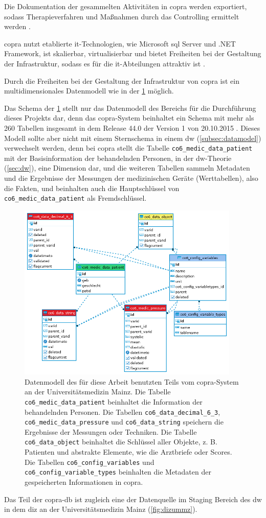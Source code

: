 Die Dokumentation der gesammelten Aktivitäten in \ac{copra} werden exportiert, sodass Therapieverfahren und Maßnahmen durch das Controlling ermittelt werden \cite{copra}.

\ac{copra} nutzt etablierte \ac{it}-Technologien, wie Microsoft \acs{sql} Server und .NET Framework, ist skalierbar, virtualisierbar und bietet Freiheiten bei der Gestaltung der Infrastruktur, sodass es für die \ac{it}-Abteilungen attraktiv ist \cite{copra}.

Durch die Freiheiten bei der Gestaltung der Infrastruktur von \ac{copra} ist ein multidimensionales Datenmodell wie in der \ref{fig:copraschema} möglich. 

Das Schema der \ref{fig:copraschema} stellt nur das Datenmodell des Bereichs für die Durchführung dieses Projekts dar, denn das \ac{copra}-System beinhaltet ein Schema mit mehr als 260 Tabellen insgesamt in dem Release 44.0 der Version 1 von 20.10.2015 \cite{copradoc}. Dieses Modell sollte aber nicht mit einem Sternschema in einem \ac{dw} (\ref{subsec:datamodel}) verwechselt werden, denn bei \ac{copra} stellt die Tabelle \texttt{co6\_medic\_data\_patient} mit der Basisinformation der behandelnden Personen, in der \ac{dw}-Theorie (\ref{sec:dw}), eine Dimension dar, und die weiteren Tabellen sammeln Metadaten und die Ergebnisse der Messungen der medizinischen Geräte (Werttabellen), also die Fakten, und beinhalten auch die Hauptschlüssel von \texttt{co6\_medic\_data\_patient} als Fremdschlüssel.

\clearpage

\begin{figure}[ht]
	\centering
	\includegraphics[height=8.5cm]{figures/copra_data_model_data}
	\caption[Datenmodell von \acs{copra}]{Datenmodell des für diese Arbeit benutzten Teils vom \ac{copra}-System an der Universitätsmedizin Mainz. Die Tabelle \texttt{co6\_medic\_data\_patient} beinhaltet die Information der behandelnden Personen. Die Tabellen \texttt{co6\_data\_decimal\_6\_3}, \texttt{co6\_medic\_data\_pressure} und \texttt{co6\_data\_string} speichern die Ergebnisse der Messungen oder Techniken. Die Tabelle \texttt{co6\_data\_object} beinhaltet die Schlüssel aller Objekte, z. B. Patienten und abstrakte Elemente, wie die Arztbriefe oder Scores.
	Die Tabellen \texttt{co6\_config\_variables} und \texttt{co6\_config\_variable\_types} beinhalten die Metadaten der gespeicherten Informationen in \ac{copra}.}
	\label{fig:copraschema}
\end{figure}

Das Teil der \ac{copra}-\ac{db} ist zugleich eine der Datenquelle im Staging Bereich des \ac{dw}  in dem \ac{diz} an der Universitätsmedizin Mainz (\ref{fig:dizummz}).